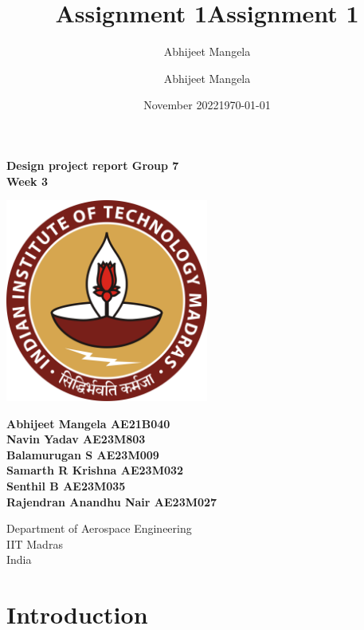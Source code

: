 \documentclass[12 pt]{article}
\title{Assignment 1}
\author{Abhijeet Mangela}
\date{November 2022}
\title{Assignment 1}
\author{Abhijeet Mangela}
\date{\today}
\begin{document}
\begin{titlepage}
\begin{center}

\textbf{\huge Design project report Group 7 \\ \vspace{0.4 cm} Week 3} \\

\vspace{2 cm}

\centering
\includegraphics[width=0.5\textwidth]{IIT_Madras_Logo.svg.png}
\label{fig:my_label}

\vspace{1cm}

\textbf{Abhijeet Mangela AE21B040 \\ Navin Yadav AE23M803 \\ Balamurugan S AE23M009 \\ Samarth R Krishna AE23M032 \\ Senthil B AE23M035 \\ Rajendran Anandhu Nair AE23M027 }

\vspace{0.5cm}

\footnotesize Department of Aerospace Engineering \\
IIT Madras \\
India

\normalsize

\end{center}
\end{titlepage}


\newpage

\tableofcontents

\newpage


\section{Introduction}
\end{document}
